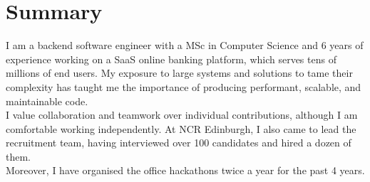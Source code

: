 \documentclass[nocolors]{curriculum-vitae}
\begin{document}
    \section{Summary}
        \vspace*{-0.2cm}
        I am a backend software engineer with a MSc in Computer Science and 6 years of\\experience working on a SaaS online banking platform, which serves tens of millions of end users.
        My exposure to large systems and solutions to tame their complexity has taught me the importance of producing performant, scalable, and maintainable code.\\
        I value collaboration and teamwork over individual contributions, although I am comfortable working independently.
        At NCR Edinburgh, I also came to lead the recruitment team, having interviewed over 100 candidates and hired a dozen of them.\\
        Moreover, I have organised the office hackathons twice a year for the past 4 years.
\end{document}
